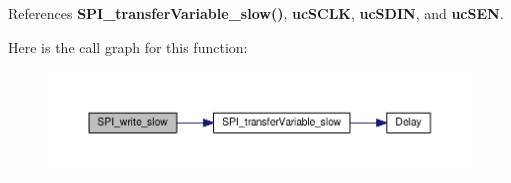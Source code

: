 References {\bf S\+P\+I\+\_\+transfer\+Variable\+\_\+slow()}, {\bf uc\+S\+C\+LK}, {\bf uc\+S\+D\+IN}, and {\bf uc\+S\+EN}.



Here is the call graph for this function\+:
\nopagebreak
\begin{figure}[H]
\begin{center}
\leavevmode
\includegraphics[width=350pt]{da/d00/spi_8c_a44f9b46b44823ccdf32a52d741882117_cgraph}
\end{center}
\end{figure}


